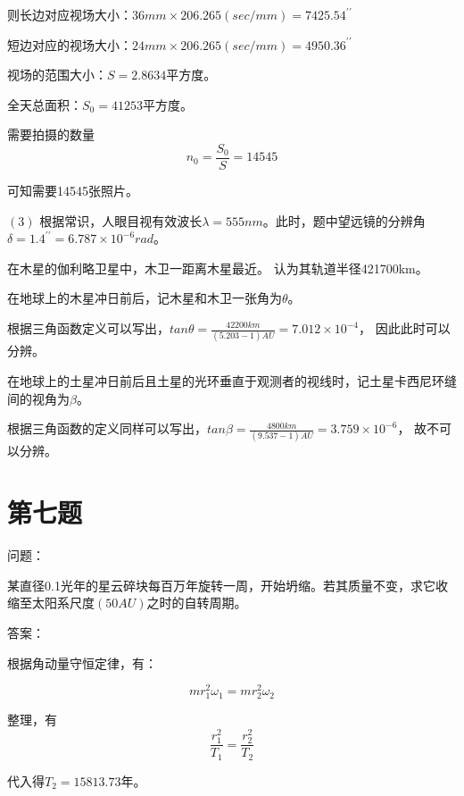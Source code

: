 \documentclass[a4paper,12pt]{report}
\begin{document}
\noindent 则长边对应视场大小：$36mm \times206.265(sec/mm)= 7425.54^{\prime\prime}$

\noindent 短边对应的视场大小：$24mm\times 206.265(sec/mm)=4950.36^{\prime\prime}$

\noindent 视场的范围大小：$S=2.8634$平方度。

\noindent 全天总面积：$S_{0}=41253$平方度。

\noindent 需要拍摄的数量 
\begin{equation}
	n_{0}=\frac{S_{0}}{S}=14545
\end{equation}

\noindent 可知需要14545张照片。

\noindent $\left(3\right)$
\noindent 根据常识，人眼目视有效波长$\lambda = 555 nm$。此时，题中望远镜的分辨角$\delta = 1.4^{\prime\prime}=6.787\times 10^{-6}rad$。

\noindent 在木星的伽利略卫星中，木卫一距离木星最近。
认为其轨道半径421700km。

\noindent 在地球上的木星冲日前后，记木星和木卫一张角为$\theta$。

\noindent 根据三角函数定义可以写出，$tan\theta = \frac{42200km}{(5.203-1)AU}=7.012\times 10^{-4}$， 因此此时可以分辨。

\noindent 在地球上的土星冲日前后且土星的光环垂直于观测者的视线时，记土星卡西尼环缝间的视角为$\beta$。

\noindent 根据三角函数的定义同样可以写出，$tan\beta = \frac{4800km}{(9.537-1)AU}=3.759\times 10^{-6}$，
故不可以分辨。
\section{第七题}
\noindent 问题：

某直径0.1光年的星云碎块每百万年旋转一周，开始坍缩。若其质量不变，求它收缩至太阳系尺度$\left(50AU\right)$之时的自转周期。

\noindent 答案：

\noindent 根据角动量守恒定律，有：

\begin{equation}
	mr_{1}^2\omega_{1}=mr_{2}^2\omega_{2}
\end{equation}

\noindent 整理，有
\begin{equation}
	\frac{r_{1}^2}{T_{1}}=\frac{r_{2}^2}{T_{2}}
\end{equation}

代入得$T_{2}=15813.73$年。
\end{document}
